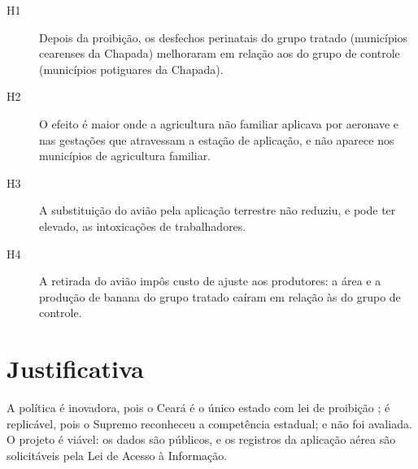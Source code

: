 \begin{description}
\item[H1] Depois da proibição, os desfechos perinatais do grupo tratado
(municípios cearenses da Chapada) melhoraram em relação aos do grupo de
controle (municípios potiguares da Chapada).
\item[H2] O efeito é maior onde a agricultura não familiar aplicava por
aeronave e nas gestações que atravessam a estação de aplicação, e não aparece
nos municípios de agricultura familiar.
\item[H3] A substituição do avião pela aplicação terrestre não reduziu, e pode
ter elevado, as intoxicações de trabalhadores.
\item[H4] A retirada do avião impôs custo de ajuste aos produtores: a área e a
produção de banana do grupo tratado caíram em relação às do grupo de controle.
\end{description}

\section{Justificativa}

A política é inovadora, pois o Ceará é o único estado com lei de proibição
\cite{olivete2025}; é replicável, pois o Supremo reconheceu a competência
estadual; e não foi avaliada. O
projeto é viável: os dados são públicos, e os registros da aplicação aérea são
solicitáveis pela Lei de Acesso à Informação.
